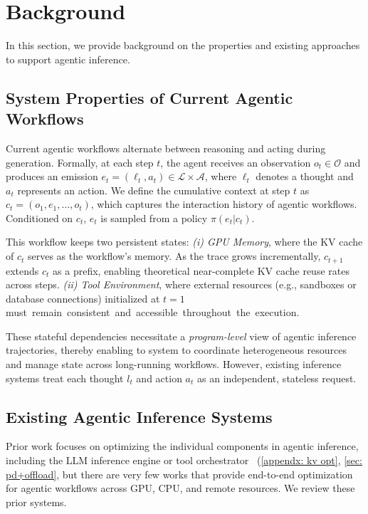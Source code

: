 \vspace{-2mm}
\section{Background}
In this section, we provide background on the properties and existing approaches to support agentic inference.
\subsection{System Properties of Current Agentic Workflows}
\label{sec::react agent system}

Current agentic workflows alternate between reasoning and acting during generation. Formally, at each step $t$, the agent receives an observation $o_t \in \mathcal{O}$ and produces an emission $e_t = (\ell_t, a_t) \in \mathcal{L} \times \mathcal{A}$, where $\ell_t$ denotes a thought and $a_t$ represents an action. We define the cumulative context at step $t$ as $c_t = (o_1, e_1, \dots, o_t)$, which captures the interaction history of agentic workflows. Conditioned on $c_t$, $e_t$ is sampled from a policy $\pi(e_t|c_t)$.

This workflow keeps two persistent states: \textit{(i) GPU Memory}, where the KV cache of $c_t$ serves as the workflow’s memory. As the trace grows incrementally, $c_{t+1}$ extends $c_t$ as a prefix, enabling theoretical near-complete KV cache reuse rates across steps. \textit{(ii) Tool Environment}, where external resources (e.g., sandboxes or database connections) initialized at $t=1$ \mbox{must remain consistent and accessible throughout the execution.}

These stateful dependencies necessitate a \textit{program-level} view of agentic inference trajectories, thereby enabling to system to coordinate heterogeneous resources and manage state across long-running workflows. However, existing inference systems treat each thought $l_t$ and action $a_t$ as an independent, stateless request.

\vspace{-2mm}
\subsection{Existing Agentic Inference Systems}

Prior work focuses on optimizing the individual components in agentic inference, including the LLM inference engine or tool orchestrator ~(\autoref{appendx: kv opt}, \autoref{sec: pd+offload}, but there are very few works that provide end-to-end optimization for agentic workflows across GPU, CPU, and remote resources. We review these prior systems.

